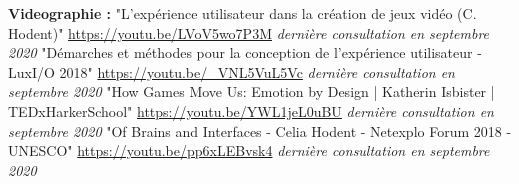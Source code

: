 \documentclass[11pt]{article}
\begin{document}
\hspace*{-1cm}
\Large{\textbf{Videographie :}}\newline
	"L'expérience utilisateur dans la création de jeux vidéo (C. Hodent)" \href{https://youtu.be/LVoV5wo7P3M}{https://youtu.be/LVoV5wo7P3M} \textit{dernière consultation en septembre 2020} \newline
	"Démarches et méthodes pour la conception de l'expérience utilisateur - LuxI/O 2018" \href{https://youtu.be/_VNL5VuL5Vc}{https://youtu.be/\_VNL5VuL5Vc} \textit{dernière consultation en septembre 2020} \newline
	"How Games Move Us: Emotion by Design | Katherin Isbister | TEDxHarkerSchool" \href{https://youtu.be/YWL1jeL0uBU}{https://youtu.be/YWL1jeL0uBU} \textit{dernière consultation en septembre 2020} \newline
	"Of Brains and Interfaces - Celia Hodent - Netexplo  Forum 2018 - UNESCO" \href{https://youtu.be/pp6xLEBvsk4}{https://youtu.be/pp6xLEBvsk4} \textit{dernière consultation en septembre 2020}\par

\newpage
\appendix
\renewcommand{\appendixpagename}{Annexes}\appendixpage
%	
\end{document}
